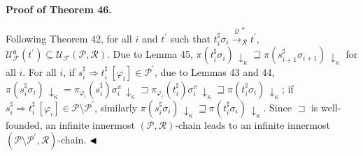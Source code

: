 \documentclass[10pt,a4paper]{amsart}
\begin{document}

 
 
\par\medskip\noindent\textbf{Proof of Theorem 46.}\par
 
 
Following Theorem 42, for all $i$ and $t^{\prime}$ such that $t_{i}^{\sharp}\sigma_{i}\xrightarrow{\scriptscriptstyle\mathcal{Q}}_{\mathcal{R}}^{*}t^{\prime}$, $\mathcal{U}_{\mathcal{F}}^{\mathfrak{a}}(t^{\prime})\subseteq\mathcal{U}_{\mathcal{F}}(\mathcal{P},\mathcal{R})$. Due to Lemma 45, $\pi(t_{i}^{\sharp}\sigma_{i})\,{\downarrow}_{\kappa}\sqsupseteq\pi(s_{i+1}^{\sharp}\sigma_{i+1})\,{\downarrow}_{\kappa}$ for all $i$. For all $i$, if ${s_{i}^{\sharp}}\Rightarrow{t_{i}^{\sharp}}\ [\varphi_{i}]\in\mathcal{P}^{\prime}$, due to Lemmas 43 and 44, $\pi(s_{i}^{\sharp}\sigma_{i})\,{\downarrow}_{\kappa}=\pi_{\varphi_{i}}(s_{i}^{\sharp})\sigma_{i}^{\pi}\,{\downarrow}_{\kappa}\sqsupset\pi_{\varphi_{i}}(t_{i}^{\sharp})\sigma_{i}^{\pi}\,{\downarrow}_{\kappa}\sqsupseteq\pi(t_{i}^{\sharp}\sigma_{i})\,{\downarrow}_{\kappa}$; if ${s_{i}^{\sharp}}\Rightarrow{t_{i}^{\sharp}}\ [\varphi_{i}]\in\mathcal{P}\setminus\mathcal{P}^{\prime}$, similarly $\pi(s_{i}^{\sharp}\sigma_{i})\,{\downarrow}_{\kappa}\sqsupseteq\pi(t_{i}^{\sharp}\sigma_{i})\,{\downarrow}_{\kappa}$. Since $\sqsupset$ is well-founded, an infinite innermost $(\mathcal{P},\mathcal{R})$-chain leads to an infinite innermost $(\mathcal{P}\setminus\mathcal{P}^{\prime},\mathcal{R})$-chain. $\hfill\blacktriangleleft$\par
 
 
 
\end{document}
